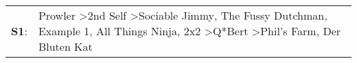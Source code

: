 \begin{supertabular}{p{0.03\textwidth}p{0.92\textwidth}}
 \textbf{S1}:  &  Prowler\textsuperscript{} \textgreater \enspace 2nd Self\textsuperscript{} \textgreater \enspace Sociable Jimmy\textsuperscript{}, \enspace The Fussy Dutchman\textsuperscript{}, \enspace Example 1\textsuperscript{}, \enspace All Things Ninja\textsuperscript{}, \enspace 2x2\textsuperscript{} \textgreater \enspace Q*Bert\textsuperscript{} \textgreater \enspace Phil's Farm\textsuperscript{}, \enspace Der Bluten Kat\textsuperscript{}  \enspace  \\
\end{supertabular}
